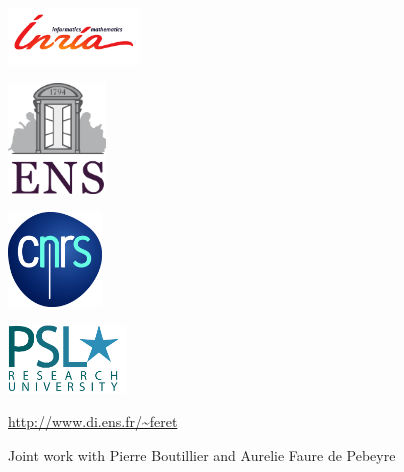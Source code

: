 \documentclass[landscape,20pt]{transparents2e}
\newcommand{\red}{\textcolor{red}}
\begin{document}
\begin{slide}{}
\begin{center}
\begin{minipage}{\linewidth}
\hfill\hfill
\begin{minipage}{0.08\linewidth}
\includegraphics[height=1.5cm]{inr_logo_cherch_UK_coul.png}
\end{minipage}\hfill
\begin{minipage}{0.08\linewidth}
  \includegraphics[height=2.92cm]{ENS_Logo.png}
\end{minipage}\hfill
\begin{minipage}{0.08\linewidth}
\includegraphics[height=2.5cm]{CNRSfilaire-grand.jpg}
\end{minipage}\hfill
\begin{minipage}{0.1\linewidth}
  \includegraphics[height=1.81cm]{UPL3732886268454158059_logoPSLstar_RU_rvb.png}
\end{minipage}\hfill\hfill\mbox{}
\end{minipage}
\end{center}


\vspace*{0.4cm}

\begin{center}
\red{\url{http://www.di.ens.fr/~feret}}
\end{center}


\vspace*{0.4cm}

\begin{center}
\huge{Joint work with Pierre Boutillier and Aurelie Faure de Pebeyre}
\end{center}

\vspace*{0.4cm}


\begin{center}
\huge{\ladate}
\end{center}

\vfill

\end{slide}
\end{document}

